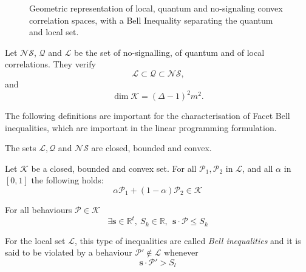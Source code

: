 \begin{figure}[t!]
    \centering
    
    \caption{Geometric representation of local, quantum and no-signaling convex correlation spaces, with a Bell Inequality separating the quantum and local set.}
    \label{fig:geometric-correlations}
\end{figure}

\begin{proposition} \label{prop:corr}
Let $\mathcal{NS}$, $\mathcal{Q}$ and $\mathcal{L}$ be the set of no-signalling, of quantum and of local correlations. They verify
\begin{equation*}
\mathcal{L} \subset \mathcal{Q} \subset \mathcal{NS} \text{,}
\end{equation*}
and
\begin{equation}
\dim  \mathcal K = (\Delta - 1)^2 m^2 \text{.}
\end{equation}
\end{proposition}

The following definitions are important for the characterisation of Facet Bell inequalities, which are important in the linear programming formulation.

\begin{proposition}
The sets $\mathcal{L}, \mathcal{Q}$ and  $\mathcal{NS} $ are closed, bounded and convex. 
\end{proposition}

\begin{proposition}
Let $\mathcal{K}$ be a closed, bounded and convex set. For all $\mathcal P_1, \mathcal P_2 $ in
$\mathcal L$, and all
$\alpha$ in $[0, 1]$ the following holds:
\begin{equation}
    \alpha  \mathcal{P}_1 + (1-\alpha) \mathcal{P}_2 \in \mathcal{K}
\end{equation}
\end{proposition}


\begin{proposition}
For all behaviours $\mathcal P \in \mathcal K$
\begin{equation}
\exists \mathbf{s} \in \mathbb{R}^t,\  S_k \in \mathbb{R} ,\ \  \mathbf{s}\cdot\mathcal{P} \leq S_k
\end{equation}
\end{proposition}


\begin{definition}
For the local set $\mathcal{L}$, this type of inequalities are called \emph{Bell inequalities}
and it is said to be violated by a behaviour $\mathcal{P'} \notin \mathcal{L}$ whenever
\begin{equation*}
    \mathbf{s}\cdot\mathcal{P'} > S_l
\end{equation*}
\end{definition}


